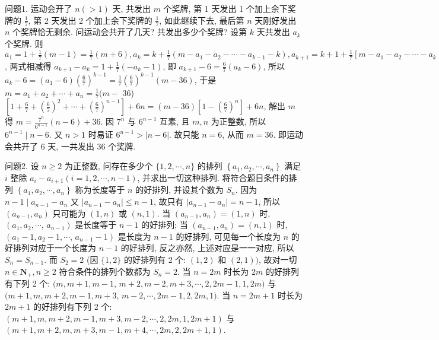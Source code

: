
问题1. 运动会开了 $n(>1)$ 天, 共发出 $m$ 个奖牌, 第 1 天发出 1 个加上余下奖牌的 $\frac{1}{7}$, 第 2 天发出 2 个加上余下奖牌的 $\frac{1}{7}$, 如此继续下去, 最后第 $n$ 天刚好发出 $n$ 个奖牌恰无剩余.
问运动会共开了几天? 共发出多少个奖牌? 
设第 $k$ 天共发出 $a_k$ 个奖牌.
则 $a_1=1+\frac{1}{7}(m-1)=\frac{1}{7}(m+6), a_k=k+ \frac{1}{7}\left(m-a_1-a_2-\cdots-a_{k-1}-k\right), a_{k+1}=k+1+\frac{1}{7}\left[m-a_1-a_2-\cdots-a_k-(k+1)\right]$, 两式相减得 $a_{k+1}-a_k=1+\frac{1}{7}\left(-a_k-1\right)$, 即 $a_{k+1}-6=\frac{6}{7}\left(a_k-6\right)$, 所以 $a_k-6= \left(a_1-6\right)\left(\frac{6}{7}\right)^{k-1}=\frac{1}{7}\left(\frac{6}{7}\right)^{k-1}(m-36)$, 于是 $m=a_1+a_2+\cdots+a_n=\frac{1}{7}(m-$ 36) $\left[1+\frac{6}{7}+\left(\frac{6}{7}\right)^2+\cdots+\left(\frac{6}{7}\right)^{n-1}\right]+6 n=(m-36)\left[1-\left(\frac{6}{7}\right)^n\right]+6 n$, 解出 $m$ 得 $m=\frac{7^n}{6^{n-1}}(n-6)+36$. 因 $7^n$ 与 $6^{n-1}$ 互素, 且 $m, n$ 为正整数, 所以 $6^{n-1} \mid n-6$. 又 $n>1$ 时易证 $6^{n-1}>|n-6|$. 故只能 $n=6$, 从而 $m=36$. 即运动会共开了 6 天, 一共发出 36 个奖牌.



问题2. 设 $n \geqslant 2$ 为正整数, 问存在多少个 $\{1,2, \cdots, n\}$ 的排列 $\left\{a_1, a_2, \cdots, a_n\right\}$ 满足 $i$ 整除 $a_i-a_{i+1}(i=1,2, \cdots, n-1)$, 并求出一切这种排列.
将符合题目条件的排列 $\left\{a_1, a_2, \cdots, a_n\right\}$ 称为长度等于 $n$ 的好排列, 并设其个数为 $S_n$. 因为 $n-1 \mid a_{n-1}-a_n$ 又 $\left|a_{n-1}-a_n\right| \leqslant n-1$, 故只有 $\left|a_{n-1}-a_n\right|=n-1$,
所以 $\left(a_{n-1}, a_n\right)$ 只可能为 $(1, n)$ 或 $(n, 1)$. 当 $\left(a_{n-1}, a_n\right)=(1, n)$ 时, $\left(a_1, a_2, \cdots\right.$, $\left.a_{n-1}\right)$ 是长度等于 $n-1$ 的好排列; 当 $\left(a_{n-1}, a_n\right)=(n, 1)$ 时, $\left(a_1-1, a_2-1, \cdots\right.$, $\left.a_{n-1}-1\right)$ 是长度为 $n-1$ 的好排列, 可见每一个长度为 $n$ 的好排列对应于一个长度为 $n-1$ 的好排列, 反之亦然, 上述对应是一一对应, 所以 $S_n=S_{n-1}$. 而 $S_2=2$ (因 $\{1,2\}$ 的好排列有 2 个: $(1,2)$ 和 $(2,1))$, 故对一切 $n \in \mathbf{N}_{+}, n \geqslant 2$ 符合条件的排列个数都为 $S_n=2$. 当 $n=2 m$ 时长为 $2 m$ 的好排列有下列 2 个: $(m, m+1, m-1$, $m+2, m-2, m+3, \cdots, 2,2 m-1,1,2 m)$ 与 $(m+1, m, m+2, m-1, m+3$, $m-2, \cdots, 2 m-1,2,2 m, 1)$. 当 $n=2 m+1$ 时长为 $2 m+1$ 的好排列有下列 2 个: $(m+1, m, m+2, m-1, m+3, m-2, \cdots, 2,2 m, 1,2 m+1)$ 与 $(m+1, m+ 2, m, m+3, m-1, m+4, \cdots, 2 m, 2,2 m+1,1)$.



